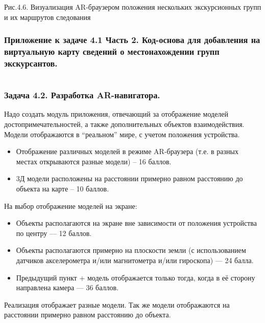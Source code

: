 \begin{center}
Рис.4.6. Визуализация AR-браузером положения нескольких экскурсионных групп и их   маршрутов следования 
\end{center}

\subsubsection*{Приложение к задаче 4.1 Часть 2. Код-основа для добавления на виртуальную карту сведений о местонахождении групп экскурсантов.}

\inputminted[fontsize=\footnotesize, linenos]{csharp}{final/command_tour/ar/task_04/source2.cs}

\subsubsection*{Задача 4.2. Разработка AR-навигатора.}

Надо создать модуль приложения, отвечающий за отображение моделей достопримечательностей, а также дополнительных объектов взаимодействия. Модели отображаются в “реальном” мире, с учетом положения устройства.

\markSection

\begin{itemize}
\item Отображение различных моделей в режиме AR-браузера (т.е. в разных местах открываются разные модели) – 16 баллов.
\item 3Д модели расположены на расстоянии примерно равном расстоянию до объекта на карте – 10 баллов.
\end{itemize}

На выбор отображение моделей на экране:
\begin{itemize}
    \item Объекты располагаются на экране вне зависимости от положения устройства по центру — 12 баллов.
    \item Объекты располагаются примерно на плоскости земли (с использованием датчиков акселерометра и/или магнитометра и/или гироскопа) — 24 балла.
    \item Предыдущий пункт + модель отображается только тогда, когда в её сторону направлена камера — 36 баллов.
\end{itemize}

\solutionSection

Реализация отображает разные модели. Так же модели отображаются на расстоянии примерно равном расстоянию до объекта. 

